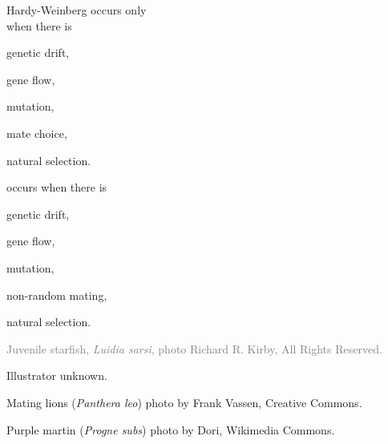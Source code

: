 \documentclass[t]{beamer}
\begin{document}

\begin{frame}{Hardy-Weinberg  occurs only\\when there is}
	
	\hangpara {} genetic drift, 
	\pause
	
	\hangpara {} gene flow,
	\pause
	
	\hangpara {} mutation,
	\pause
	
	\hangpara {} mate choice, \pause {}
	
	\hangpara {} natural selection.
	
\end{frame}

\begin{frame}{ occurs when there is}
	
	\hangpara genetic drift,
	
	\hangpara gene flow,
	
	\hangpara mutation,
	
	\hangpara non-random mating, 
	
	\hangpara natural selection.

\end{frame}

{
\begin{frame}[b,plain]{}
\end{frame}
}

{
\begin{frame}[b,plain]{}
\textcolor{gray}{\Tiny Juvenile starfish, \textit{Luidia sarsi}, photo \textcopyright Richard R. Kirby, All Rights Reserved.}
\end{frame}
}

{
\begin{frame}[b,plain]{}
\hfill\textcolor{gray!50!white}{\Tiny Illustrator unknown.}
\end{frame}
}

{
\begin{frame}[b,plain]{}
\Tiny Mating lions (\textit{Panthera leo}) photo by Frank Vassen, Creative Commons.
\end{frame}
}
{
\begin{frame}[b,plain]{}
\hfill\Tiny Purple martin (\textit{Progne subs}) photo by Dori, Wikimedia Commons.
\end{frame}
}
\end{document}
